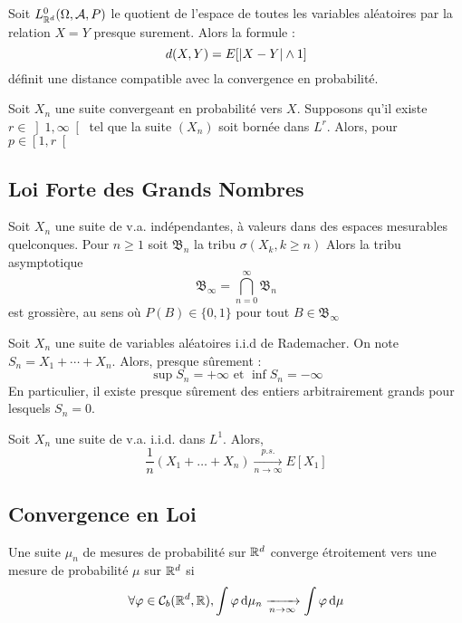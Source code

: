 \documentclass{cours}
\begin{document}
\begin{proposition}
    Soit $L_{\mathbb{R}^{d}}^{0}(\Omega, \mathcal{A}, P)$ le quotient de l'espace de toutes les variables aléatoires par la relation $X = Y$ presque surement. Alors la formule :
    \[
        d(X, Y) = E[\left|X - Y\right| \land 1]
    \]
    définit une distance compatible avec la convergence en probabilité.
\end{proposition}

\begin{proposition}
    Soit $X_{n}$ une suite convergeant en probabilité vers $X$. Supposons qu'il existe $r \in \left]1, \infty \right[$ tel que la suite $(X_{n})$ soit bornée dans $L^{r}$. Alors, pour $p \in \left[1, r\right[$
\end{proposition}

\subsection{Loi Forte des Grands Nombres}
\begin{theorem}
    Soit $X_{n}$ une suite de v.a. indépendantes, à valeurs dans des espaces mesurables quelconques. Pour $n \geq 1$ soit $\mathfrak{B}_{n}$ la tribu $\sigma(X_{k}, k\geq n)$
    Alors la tribu asymptotique \[\mathfrak{B}_{\infty} = \bigcap_{n = 0}^{\infty} \mathfrak{B}_{n}\] est grossière, au sens où $P(B) \in \{0, 1\}$ pour tout $B \in \mathfrak{B}_{\infty}$
\end{theorem}

\begin{proposition}
    Soit $X_{n}$ une suite de variables aléatoires i.i.d de Rademacher. On note $S_{n} = X_{1} + \cdots + X_{n}$. Alors, presque sûrement :
    \[
        \sup S_{n} = +\infty \text{ et } \inf S_{n} = -\infty
    \]
    En particulier, il existe presque sûrement des entiers arbitrairement grands pour lesquels $S_{n} = 0$.
\end{proposition}

\begin{theorem}
    Soit $X_{n}$ une suite de v.a. i.i.d. dans $L^{1}$. Alors,
    \[
        \frac{1}{n}\left(X_{1} + \ldots + X_{n}\right) \xrightarrow[n \to \infty]{p.s.} E[X_{1}]
    \]
\end{theorem}

\subsection{Convergence en Loi}
\begin{definition}
    Une suite $\mu_{n}$ de mesures de probabilité sur $\mathbb{R}^{d}$ converge étroitement vers une mesure de probabilité $\mu$ sur $\mathbb{R}^{d}$ si
    \[
        \forall \varphi \in \mathcal{C}_{b}(\mathbb{R}^{d}, \mathbb{R}), \int \varphi {\rm \, d}\mu_{n} \xrightarrow[n \to \infty]{} \int \varphi {\rm \, d}\mu
    \]
\end{definition}
\end{document}
